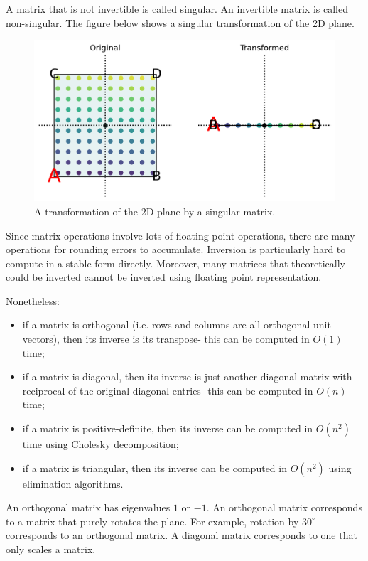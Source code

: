 \documentclass[a4paper, openany]{memoir}
\begin{document}
    A matrix that is not invertible is called singular. An invertible matrix is called non-singular. The figure below shows a singular transformation of the 2D plane.
    \begin{figure}[H]
        \centering
        \includegraphics[scale=0.4]{src/3.33 2D singular transform.png}
        \caption{A transformation of the 2D plane by a singular matrix.}
    \end{figure}
    Since matrix operations involve lots of floating point operations, there are many operations for rounding errors to accumulate. Inversion is particularly hard to compute in a stable form directly. Moreover, many matrices that theoretically could be inverted cannot be inverted using floating point representation.

    Nonetheless:
    \begin{itemize}
        \item if a matrix is orthogonal (i.e. rows and columns are all orthogonal unit vectors), then its inverse is its transpose- this can be computed in $O(1)$ time;
        \item if a matrix is diagonal, then its inverse is just another diagonal matrix with reciprocal of the original diagonal entries- this can be computed in $O(n)$ time;
        \item if a matrix is positive-definite, then its inverse can be computed in $O(n^2)$ time using Cholesky decomposition;
        \item if a matrix is triangular, then its inverse can be computed in $O(n^2)$ using elimination algorithms.
    \end{itemize}
    An orthogonal matrix has eigenvalues $1$ or $-1$. An orthogonal matrix corresponds to a matrix that purely rotates the plane. For example, rotation by $30^{\circ}$ corresponds to an orthogonal matrix. A diagonal matrix corresponds to one that only scales a matrix.
\end{document}
